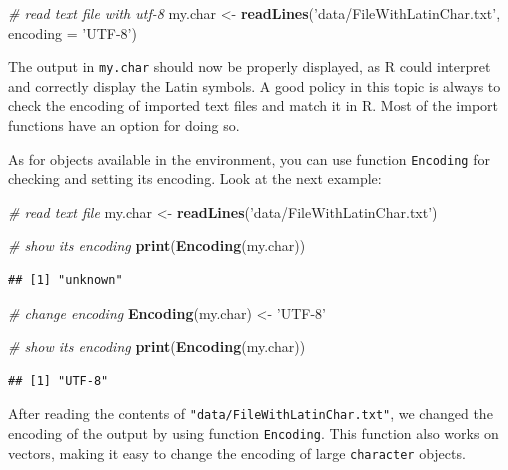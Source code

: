 \documentclass[11pt,]{book}
\newenvironment{Shaded}{\begin{snugshade}}{\end{snugshade}}
\newcommand{\KeywordTok}[1]{\textcolor[rgb]{0.27,0.27,0.27}{\textbf{#1}}}
\newcommand{\DataTypeTok}[1]{\textcolor[rgb]{0.27,0.27,0.27}{#1}}
\newcommand{\StringTok}[1]{\textcolor[rgb]{0.5,0.5,0.5}{#1}}
\newcommand{\CommentTok}[1]{\textcolor[rgb]{0.56,0.35,0.01}{\textit{#1}}}
\newcommand{\NormalTok}[1]{#1}
\begin{document}
\begin{Shaded}
\begin{Highlighting}[]
\CommentTok{# read text file with utf-8}
\NormalTok{my.char <-}\StringTok{ }\KeywordTok{readLines}\NormalTok{(}\StringTok{'data/FileWithLatinChar.txt'}\NormalTok{, }
                     \DataTypeTok{encoding =} \StringTok{'UTF-8'}\NormalTok{) }
\end{Highlighting}
\end{Shaded}

The output in \texttt{my.char} should now be properly displayed, as R
could interpret and correctly display the Latin symbols. A good policy
in this topic is always to check the encoding of imported text files and
match it in R. Most of the import functions have an option for doing so.

As for objects available in the environment, you can use function
\texttt{Encoding} for checking and setting its encoding. Look at the
next example:

\begin{Shaded}
\begin{Highlighting}[]
\CommentTok{# read text file}
\NormalTok{my.char <-}\StringTok{ }\KeywordTok{readLines}\NormalTok{(}\StringTok{'data/FileWithLatinChar.txt'}\NormalTok{)}

\CommentTok{# show its encoding}
\KeywordTok{print}\NormalTok{(}\KeywordTok{Encoding}\NormalTok{(my.char))}
\end{Highlighting}
\end{Shaded}

\begin{verbatim}
## [1] "unknown"
\end{verbatim}

\begin{Shaded}
\begin{Highlighting}[]
\CommentTok{# change encoding}
\KeywordTok{Encoding}\NormalTok{(my.char) <-}\StringTok{ 'UTF-8'}

\CommentTok{# show its encoding}
\KeywordTok{print}\NormalTok{(}\KeywordTok{Encoding}\NormalTok{(my.char))}
\end{Highlighting}
\end{Shaded}

\begin{verbatim}
## [1] "UTF-8"
\end{verbatim}

After reading the contents of \texttt{"data/FileWithLatinChar.txt"}, we
changed the encoding of the output by using function \texttt{Encoding}.
This function also works on vectors, making it easy to change the
encoding of large \texttt{character} objects.
\end{document}
